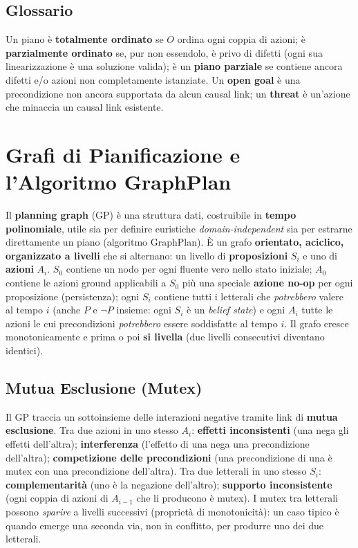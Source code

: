 \documentclass[a4paper,11pt]{article}
\begin{document}
\subsection{Glossario}

Un piano è \textbf{totalmente ordinato} se $O$ ordina ogni coppia di azioni; è \textbf{parzialmente ordinato} se, pur non essendolo, è privo di difetti (ogni sua linearizzazione è una soluzione valida); è un \textbf{piano parziale} se contiene ancora difetti e/o azioni non completamente istanziate. Un \textbf{open goal} è una precondizione non ancora supportata da alcun causal link; un \textbf{threat} è un'azione che minaccia un causal link esistente.

\newpage
\section{Grafi di Pianificazione e l'Algoritmo GraphPlan}

Il \textbf{planning graph} (GP) è una struttura dati, costruibile in \textbf{tempo polinomiale}, utile sia per definire euristiche \emph{domain-independent} sia per estrarne direttamente un piano (algoritmo GraphPlan). È un grafo \textbf{orientato, aciclico, organizzato a livelli} che si alternano: un livello di \textbf{proposizioni} $S_i$ e uno di \textbf{azioni} $A_i$. $S_0$ contiene un nodo per ogni fluente vero nello stato iniziale; $A_0$ contiene le azioni ground applicabili a $S_0$ più una speciale \textbf{azione no-op} per ogni proposizione (persistenza); ogni $S_i$ contiene tutti i letterali che \emph{potrebbero} valere al tempo $i$ (anche $P$ e $\neg P$ insieme: ogni $S_i$ è un \emph{belief state}) e ogni $A_i$ tutte le azioni le cui precondizioni \emph{potrebbero} essere soddisfatte al tempo $i$. Il grafo cresce monotonicamente e prima o poi \textbf{si livella} (due livelli consecutivi diventano identici).

\subsection{Mutua Esclusione (Mutex)}

Il GP traccia un sottoinsieme delle interazioni negative tramite link di \textbf{mutua esclusione}. Tra due azioni in uno stesso $A_i$: \textbf{effetti inconsistenti} (una nega gli effetti dell'altra); \textbf{interferenza} (l'effetto di una nega una precondizione dell'altra); \textbf{competizione delle precondizioni} (una precondizione di una è mutex con una precondizione dell'altra). Tra due letterali in uno stesso $S_i$: \textbf{complementarità} (uno è la negazione dell'altro); \textbf{supporto inconsistente} (ogni coppia di azioni di $A_{i-1}$ che li producono è mutex). I mutex tra letterali possono \emph{sparire} a livelli successivi (proprietà di monotonicità): un caso tipico è quando emerge una seconda via, non in conflitto, per produrre uno dei due letterali.
\end{document}
